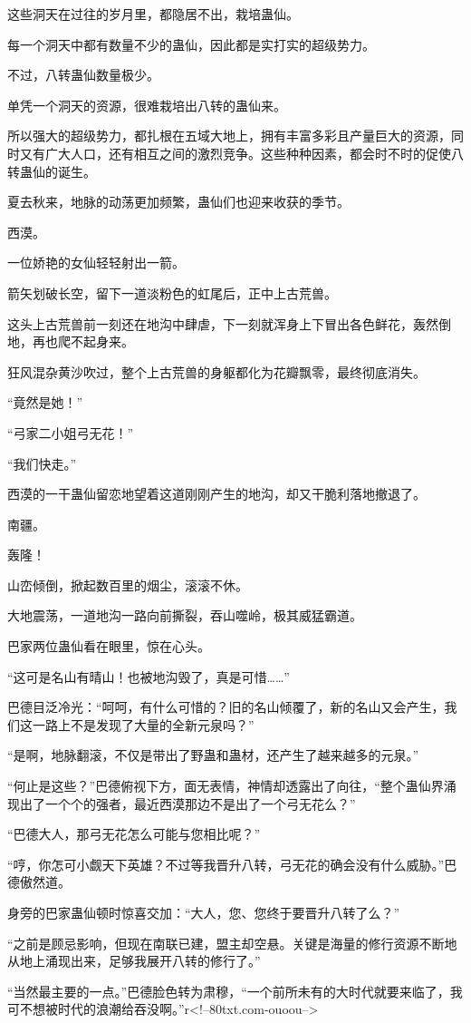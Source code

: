 \begin{this_body}
这些洞天在过往的岁月里，都隐居不出，栽培蛊仙。

每一个洞天中都有数量不少的蛊仙，因此都是实打实的超级势力。

不过，八转蛊仙数量极少。

单凭一个洞天的资源，很难栽培出八转的蛊仙来。

所以强大的超级势力，都扎根在五域大地上，拥有丰富多彩且产量巨大的资源，同时又有广大人口，还有相互之间的激烈竞争。这些种种因素，都会时不时的促使八转蛊仙的诞生。

夏去秋来，地脉的动荡更加频繁，蛊仙们也迎来收获的季节。

西漠。

一位娇艳的女仙轻轻射出一箭。

箭矢划破长空，留下一道淡粉色的虹尾后，正中上古荒兽。

这头上古荒兽前一刻还在地沟中肆虐，下一刻就浑身上下冒出各色鲜花，轰然倒地，再也爬不起身来。

狂风混杂黄沙吹过，整个上古荒兽的身躯都化为花瓣飘零，最终彻底消失。

“竟然是她！”

“弓家二小姐弓无花！”

“我们快走。”

西漠的一干蛊仙留恋地望着这道刚刚产生的地沟，却又干脆利落地撤退了。

南疆。

轰隆！

山峦倾倒，掀起数百里的烟尘，滚滚不休。

大地震荡，一道地沟一路向前撕裂，吞山噬岭，极其威猛霸道。

巴家两位蛊仙看在眼里，惊在心头。

“这可是名山有晴山！也被地沟毁了，真是可惜……”

巴德目泛冷光：“呵呵，有什么可惜的？旧的名山倾覆了，新的名山又会产生，我们这一路上不是发现了大量的全新元泉吗？”

“是啊，地脉翻滚，不仅是带出了野蛊和蛊材，还产生了越来越多的元泉。”

“何止是这些？”巴德俯视下方，面无表情，神情却透露出了向往，“整个蛊仙界涌现出了一个个的强者，最近西漠那边不是出了一个弓无花么？”

“巴德大人，那弓无花怎么可能与您相比呢？”

“哼，你怎可小觑天下英雄？不过等我晋升八转，弓无花的确会没有什么威胁。”巴德傲然道。

身旁的巴家蛊仙顿时惊喜交加：“大人，您、您终于要晋升八转了么？”

“之前是顾忌影响，但现在南联已建，盟主却空悬。关键是海量的修行资源不断地从地上涌现出来，足够我展开八转的修行了。”

“当然最主要的一点。”巴德脸色转为肃穆，“一个前所未有的大时代就要来临了，我可不想被时代的浪潮给吞没啊。”r<!--80txt.com-ouoou-->

\end{this_body}

